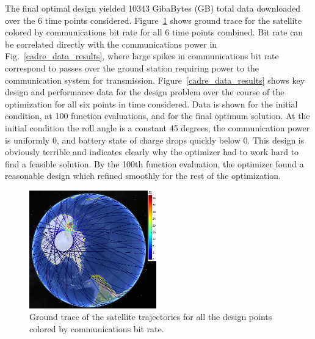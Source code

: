 \documentclass[]{aiaa-tc} %
\begin{document}
        The final optimal design yielded 10343 GibaBytes (GB) total data downloaded over the 6 time points considered. 
        Figure~\ref{fig:trajectories} shows ground trace for the satellite colored by communications bit rate
        for all 6 time points combined. Bit rate can be correlated directly with the communications power in
        Fig.~\ref{cadre_data_results}, where large spikes in communications bit rate correspond to passes over the ground station requiring 
        power to the communication system for transmission. Figure~\ref{cadre_data_results} shows key design and performance data 
        for the design problem over the course of the optimization for all six points in time considered. Data is shown for the 
        initial condition, at 100 function evaluations, and for the final optimum solution. At the initial condition
        the roll angle is a constant 45 degrees, the communication power is uniformly 0, and battery state of charge drops quickly below 0. 
        This design is obviously terrible and indicates clearly why the optimizer had to work hard to find a feasible solution. 
        By the 100th function evaluation, the optimizer found a reasonable design which refined smoothly for the rest of the optimization. 
        

        \begin{figure}[!htb]
            \centering
            \includegraphics[width=0.49\textwidth]{images/allpts_gearth_mcmurdo}
            \caption{Ground trace of the satellite trajectories
            for all the design points colored by communications bit rate.
            \label{fig:trajectories}
            }
        \end{figure}
\end{document}
